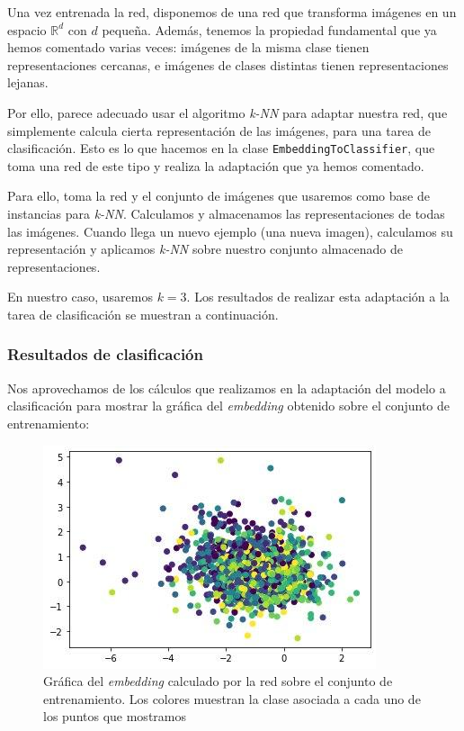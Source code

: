 \documentclass[11pt]{article}
\begin{document}
Una vez entrenada la red, disponemos de una red que transforma imágenes en un espacio $\mathbb{R}^d$ con $d$ pequeña. Además, tenemos la propiedad fundamental que ya hemos comentado varias veces: imágenes de la misma clase tienen representaciones cercanas, e imágenes de clases distintas tienen representaciones lejanas.

Por ello, parece adecuado usar el algoritmo \emph{k-NN} para adaptar nuestra red, que simplemente calcula cierta representación de las imágenes, para una tarea de clasificación. Esto es lo que hacemos en la clase \lstinline{EmbeddingToClassifier}, que toma una red de este tipo y realiza la adaptación que ya hemos comentado.

Para ello, toma la red y el conjunto de imágenes que usaremos como base de instancias para \emph{k-NN}. Calculamos y almacenamos las representaciones de todas las imágenes. Cuando llega un nuevo ejemplo (una nueva imagen), calculamos su representación y aplicamos \emph{k-NN} sobre nuestro conjunto almacenado de representaciones. 

En nuestro caso, usaremos $k = 3$. Los resultados de realizar esta adaptación a la tarea de clasificación se muestran a continuación.

\pagebreak 

\subsubsection{Resultados de clasificación} \label{random_adaptacion_resultados_clasificacion:seccion}

Nos aprovechamos de los cálculos que realizamos en la adaptación del modelo a clasificación para mostrar la gráfica del \emph{embedding} obtenido sobre el conjunto de entrenamiento:

\begin{figure}[H]
    \centering
    \includegraphics[width = 0.4 \textwidth]{random_embedding}
    \caption{Gráfica del \emph{embedding} calculado por la red sobre el conjunto de entrenamiento. Los colores muestran la clase asociada a cada uno de los puntos que mostramos}
\end{figure}
\end{document}
